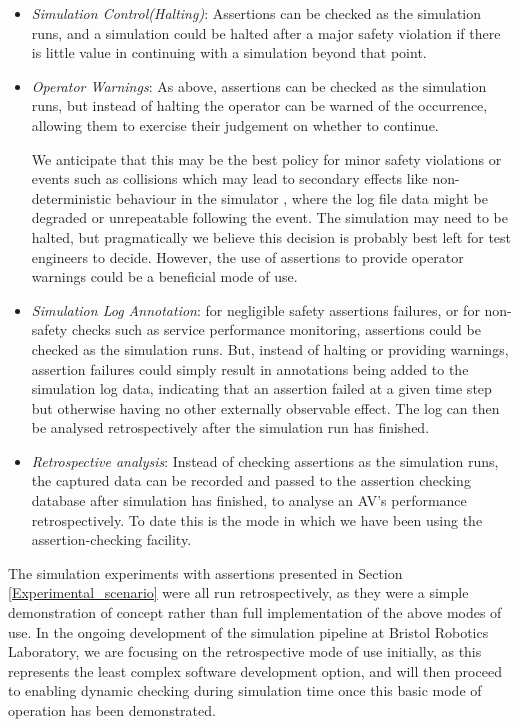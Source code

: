 	
	\begin{itemize}
		\item \emph{Simulation Control(Halting)}: Assertions can be checked as the simulation runs, and a simulation could be halted after a major safety violation if there is little value in continuing with a simulation beyond that point.
		
		\item \emph{Operator Warnings}: As above, assertions can be checked as the simulation runs, but instead of halting the operator can be warned of the occurrence, allowing them to exercise their judgement on whether to continue.
		
		We anticipate that this may be the best policy for minor safety violations or events such as collisions which may lead to secondary effects like non-deterministic behaviour in the simulator \cite{chance2021}, where the log file data might be degraded or unrepeatable following the event. The simulation may need to be halted, but pragmatically we believe this decision is probably best left for test engineers to decide. However, the use of assertions to provide operator warnings could be a beneficial mode of use.
		
		\item \emph{Simulation Log Annotation}: for negligible safety assertions failures, or for non-safety checks such as service performance monitoring, assertions could be checked as the simulation runs. But, instead of halting or providing warnings, assertion failures could simply result in annotations being added to the simulation log data, indicating that an assertion failed at a given time step but otherwise having no other externally observable effect. The log can then be analysed retrospectively after the simulation run has finished.
		
		\item \emph{Retrospective analysis}: Instead of checking assertions as the simulation runs, the captured data can be recorded and passed to the assertion checking database after simulation has finished, to analyse an AV's performance retrospectively. To date this is the mode in which we have been using the assertion-checking facility.
	\end{itemize}

	The simulation experiments with assertions presented in Section \ref{Experimental_scenario} were all run retrospectively, as they were a simple demonstration of concept rather than full implementation of the above modes of use. In the ongoing development of the simulation pipeline at Bristol Robotics Laboratory, we are focusing on the retrospective mode of use initially, as this represents the least complex software development option, and will then proceed to enabling dynamic checking during simulation time once this basic mode of operation has been demonstrated.\\ 

